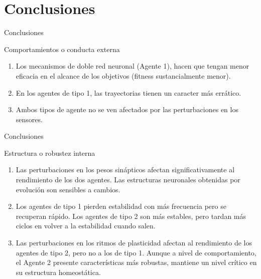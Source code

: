 \documentclass[aspectratio=169]{beamer}
\begin{document}
\section{Conclusiones}
\begin{frame}{Conclusiones}
\begin{block}{Comportamientos o conducta externa}
  \begin{enumerate}
    \item Los mecanismos de doble red neuronal (Agente 1), hacen que tengan menor eficacia en el alcance de los objetivos (fitness sustancialmente menor).
    \item En los agentes de tipo 1, las trayectorias tienen un caracter más errático.
    \item Ambos tipos de agente no se ven afectados por las perturbaciones en los sensores.
  \end{enumerate}
\end{block}
\end{frame}

\begin{frame}{Conclusiones}
\begin{block}{Estructura o robustez interna}
  \begin{enumerate}
    \item Las perturbaciones en los pesos sinápticos afectan significativamente al rendimiento de los dos agentes. Las estructuras neuronales obtenidas por evolución son sensibles a cambios.
    \item Los agentes de tipo 1 pierden estabilidad con más frecuencia pero se recuperan rápido. Los agentes de tipo 2 son más estables, pero tardan más ciclos en volver a la estabilidad cuando salen.
    \item Las perturbaciones en los ritmos de plasticidad afectan al rendimiento de los agentes de tipo 2, pero no a los de tipo 1. Aunque a nivel de comportamiento, el Agente 2 presente características más robustas,
    mantiene un nivel crítico en su estructura homeostática.
  \end{enumerate}
\end{block}
\end{frame}
\end{document}
